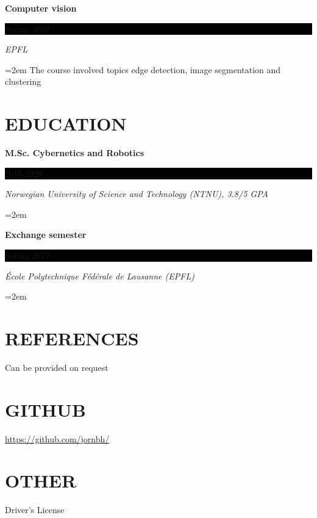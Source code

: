 \documentclass[paper=a4,fontsize=11pt,norsk]{scrartcl} %
\newlength{\spacebox}
\newcommand{\NewPart}[1]{\section*{\uppercase{#1}}}
\newcommand{\PersonalEntry}[2]{
		\noindent\hangindent=2em\hangafter=0 %
		\parbox{\spacebox}{        %
		\textit{#1}}		       %
		\hspace{1.5em} #2 \par}    %
\newcommand{\EducationEntry}[4]{
		\noindent \textbf{#1} \hfill      %
		\colorbox{Black}{%
			\parbox{6em}{%
			\hfill\color{White}#2}} \par  %
		\noindent \textit{#3} \par        %
		\noindent\hangindent=2em\hangafter=0 \small #4 %
		\normalsize \par}
\begin{document}
\EducationEntry{Computer vision}{Spring 2019}{EPFL}
{The course involved topics edge detection, image segmentation and clustering}



\NewPart{Education}{}

\EducationEntry{M.Sc. Cybernetics and Robotics}{2015-2020}{Norwegian University of Science and Technology (NTNU), 3.8/5 GPA}{}
\EducationEntry{Exchange semester}{Spring 2019}{École Polytechnique Fédérale de Lausanne (EPFL)}{}





\NewPart{References}{}
Can be provided on request



\NewPart{GitHub}{}
\url{https://github.com/jornbh/}
\NewPart{Other}{}
Driver's License
\end{document}
